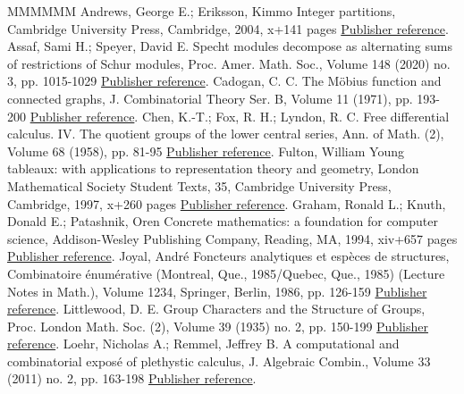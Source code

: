 \begin{thebibliography}{MMMMMM}
 Andrews, George E.; Eriksson, Kimmo Integer partitions, Cambridge University Press, Cambridge, 2004, x+141 pages \href{https://alco.centre-mersenne.org/articles/10.5802/alco.365/#MR2122332}{Publisher reference}.
 Assaf, Sami H.; Speyer, David E. Specht modules decompose as alternating sums of restrictions of Schur modules, Proc. Amer. Math. Soc., Volume 148 (2020) no. 3, pp. 1015-1029 \href{https://alco.centre-mersenne.org/articles/10.5802/alco.365/#MR4055931}{Publisher reference}.
 Cadogan, C. C. The Möbius function and connected graphs, J. Combinatorial Theory Ser. B, Volume 11 (1971), pp. 193-200 \href{https://alco.centre-mersenne.org/articles/10.5802/alco.365/#MR0284377}{Publisher reference}.
 Chen, K.-T.; Fox, R. H.; Lyndon, R. C. Free differential calculus. IV. The quotient groups of the lower central series, Ann. of Math. (2), Volume 68 (1958), pp. 81-95 \href{https://alco.centre-mersenne.org/articles/10.5802/alco.365/#MR0102539}{Publisher reference}.
 Fulton, William Young tableaux: with applications to representation theory and geometry, London Mathematical Society Student Texts, 35, Cambridge University Press, Cambridge, 1997, x+260 pages \href{https://alco.centre-mersenne.org/articles/10.5802/alco.365/#MR1464693}{Publisher reference}.
 Graham, Ronald L.; Knuth, Donald E.; Patashnik, Oren Concrete mathematics: a foundation for computer science, Addison-Wesley Publishing Company, Reading, MA, 1994, xiv+657 pages \href{https://alco.centre-mersenne.org/articles/10.5802/alco.365/#MR1397498}{Publisher reference}.
 Joyal, André Foncteurs analytiques et espèces de structures, Combinatoire énumérative (Montreal, Que., 1985/Quebec, Que., 1985) (Lecture Notes in Math.), Volume 1234, Springer, Berlin, 1986, pp. 126-159 \href{https://alco.centre-mersenne.org/articles/10.5802/alco.365/#MR0927763}{Publisher reference}.
 Littlewood, D. E. Group Characters and the Structure of Groups, Proc. London Math. Soc. (2), Volume 39 (1935) no. 2, pp. 150-199 \href{https://alco.centre-mersenne.org/articles/10.5802/alco.365/#MR1576896}{Publisher reference}.
 Loehr, Nicholas A.; Remmel, Jeffrey B. A computational and combinatorial exposé of plethystic calculus, J. Algebraic Combin., Volume 33 (2011) no. 2, pp. 163-198 \href{https://alco.centre-mersenne.org/articles/10.5802/alco.365/#MR2765321}{Publisher reference}.

\end{thebibliography}

